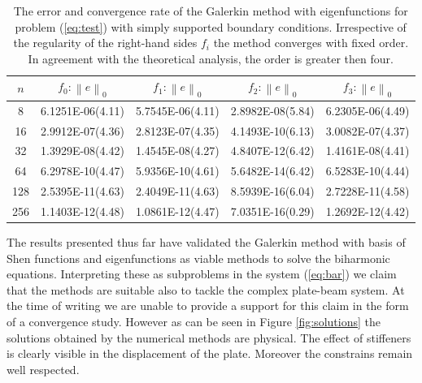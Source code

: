 \documentclass{marine_2015}
\newcommand{\norm}[1]{\ensuremath{\left\|#1\right\|}}
\begin{document}
\begin{table}[t!]
    \begin{center}
    \begin{tabular}{ccccc}
\hline
$n$  &  $f_0: \norm{e}_0$  & $f_1: \norm{e}_0$ & $f_2: \norm{e}_0$ & $f_3: \norm{e}_0$\\
\hline
8    & 6.1251E-06(4.11) & 5.7545E-06(4.11) & 2.8982E-08(5.84)& 6.2305E-06(4.49) \\
16   & 2.9912E-07(4.36) & 2.8123E-07(4.35) & 4.1493E-10(6.13)& 3.0082E-07(4.37) \\
32   & 1.3929E-08(4.42) & 1.4545E-08(4.27) & 4.8407E-12(6.42)& 1.4161E-08(4.41) \\
64   & 6.2978E-10(4.47) & 5.9356E-10(4.61) & 5.6482E-14(6.42)& 6.5283E-10(4.44) \\
128  & 2.5395E-11(4.63) & 2.4049E-11(4.63) & 8.5939E-16(6.04)& 2.7228E-11(4.58) \\
256  & 1.1403E-12(4.48) & 1.0861E-12(4.47) & 7.0351E-16(0.29)& 1.2692E-12(4.42) \\
\hline
\hline
    \end{tabular}
    \caption{The error and convergence rate of the Galerkin method with eigenfunctions for
    problem (\ref{eq:test}) with simply supported boundary conditions.
  Irrespective of the regularity of the right-hand sides $f_i$ the method
converges with fixed order. In agreement with the theoretical analysis, the
order is greater then four.}
  \label{tab:sine_convergence}
  \end{center}
  \end{table}

  The results presented thus far have validated the Galerkin method with basis
  of Shen functions and eigenfunctions as viable methods to solve the biharmonic
  equations. Interpreting these as subproblems in the system (\ref{eq:bar}) we
  claim that the methods are suitable also to tackle the complex plate-beam system.
  At the time of writing we are unable to provide a support for this claim in
  the form of a convergence study. However as can be seen in Figure \ref{fig:solutions} 
  the solutions obtained by the numerical methods are physical. The effect of
  stiffeners is clearly visible in the displacement of the plate. Moreover the 
  constrains remain well respected.
\end{document}

